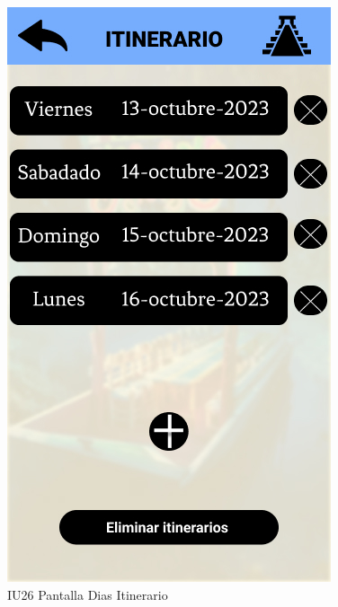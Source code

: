 \begin{figure}[h]
    \begin{minipage}{0.5\textwidth}
        \centering
        \includegraphics[width=.7\linewidth]{Pantallas Prototipo3/IU26 Pantalla Dias Itinerario.jpg}
        \caption{IU26 Pantalla Dias Itinerario}
    \end{minipage}%
\end{figure}

